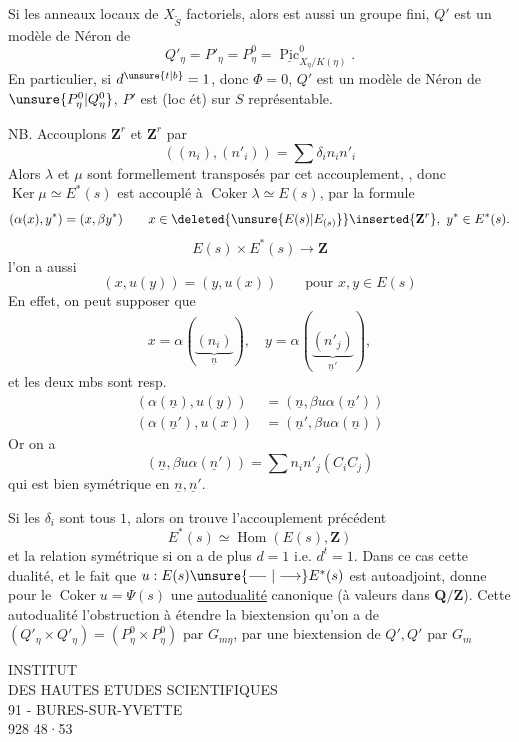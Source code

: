 Si  les anneaux locaux de $X_{\widetilde S}$ factoriels, alors  est aussi un groupe fini,
$Q'$ est un modèle de Néron de
\[
Q'_\eta=P'_\eta=P^0_\eta=\underline{\operatorname{Pic}}^0_{X_\eta/K(\eta)}.
\]
En particulier, si $d^{\unsure{t|b}}=1$, donc $\Phi=0$, $Q'$ est un modèle de Néron de $\unsure{P^0_\eta|Q^0_\eta}$,  $P'$ est (loc ét) sur $S$ représentable.

NB. Accouplons $\mathbf Z^r$ et $\mathbf Z^r$ par
\[
((n_i),(n'_i))=\sum\delta_i n_i n'_i
\]
Alors $\lambda$ et $\mu$ sont formellement transposés par cet accouplement,
, donc $\operatorname{Ker}\mu\simeq E^*(s)$ est accouplé à $\operatorname{Coker}\lambda\simeq E(s)$, par la formule
\[
(\alpha(x),y^*)=(x,\beta y^*)\qquad x\in\deleted{\unsure{E(s)|E_{(s)}}}\inserted{\mathbf Z^r},\ y^*\in E^*(s).
\]
\[
E(s)\times E^*(s)\longrightarrow\mathbf Z
\]
 l'on a aussi
\[
(x,u(y))=(y,u(x))\qquad\text{pour }x,y\in E(s)
\]
En effet, on peut supposer que
\[
x=\alpha(\underbrace{(n_i)}_{\underline n}),\quad y=\alpha(\underbrace{(n'_j)}_{\underline n'}),
\]
et les deux mbs sont resp.
\[
\begin{aligned}
(\alpha(\underline n),u(y))&=(\underline n,\beta u\alpha(\underline n'))\\
(\alpha(\underline n'),u(x))&=(\underline n',\beta u\alpha(\underline n))
\end{aligned}
\]
Or on a
\[
(\underline n,\beta u\alpha(\underline n'))=\sum n_i n'_j(C_i C_j)
\]
qui est bien symétrique en  $\underline n,\underline n'$.

Si les $\delta_i$ sont tous $1$,  alors on trouve  l'accouplement précédent
\[
E^*(s)\simeq\operatorname{Hom}(E(s),\mathbf Z)
\]
et la relation symétrique si on a de plus $d=1$ i.e. $d^t=1$.
Dans ce cas cette dualité, et le fait que $u:E(s)\unsure{\relbar\joinrel\relbar|\longrightarrow}E^*(s)$ \unsure{:} est autoadjoint, donne pour le $\operatorname{Coker}u=\Psi(s)$ une \uline{autodualité} canonique (à valeurs dans $\mathbf Q/\mathbf Z$).
Cette autodualité  l'obstruction à étendre la biextension qu'on a de $(Q'_\eta\times Q'_\eta)=(P^0_\eta\times P^0_\eta)$ par $G_{m\eta}$, par une biextension de $Q',Q'$ par $G_m$

\begin{center}
INSTITUT\\
DES HAUTES ETUDES SCIENTIFIQUES\\
91 - BURES-SUR-YVETTE\\
928 48·53
\end{center}
